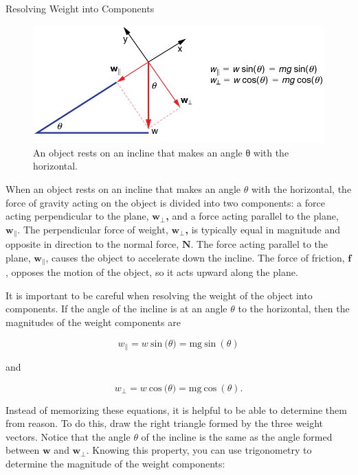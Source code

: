 \documentclass[
]{book}
\newenvironment{note}{}{}
\begin{document}
\hypertarget{fs-id2658609}{}
\begin{note}

Resolving Weight into Components

{\hfill\break
}

\begin{figure}
\hypertarget{import-auto-id1795220}{%
\centering
\includegraphics{images/Figure_04_05_03.jpg}
\caption{An object rests on an incline that makes an angle θ with the
horizontal.}\label{import-auto-id1795220}
}
\end{figure}

When an object rests on an incline that makes an angle \(\theta{}\) with
the horizontal, the force of gravity acting on the object is divided
into two components: a force acting perpendicular to the plane,
\(\textbf{w}_{\bot}{}\)\textbf{,} and a force
acting parallel to the plane, \(\textbf{w}_{\parallel}{}\). The
perpendicular force of weight,
\(\textbf{w}_{\bot}{}\)\textbf{,} is typically
equal in magnitude and opposite in direction to the normal force,
\(\textbf{N}{}\). The force acting parallel to the plane,
\(\textbf{w}_{\parallel}{}\), causes the object to accelerate down the
incline. The force of friction, \(\mathbf{f}{}\), opposes the motion of
the object, so it acts upward along the plane.

It is important to be careful when resolving the weight of the object
into components. If the angle of the incline is at an angle \(\theta{}\)
to the horizontal, then the magnitudes of the weight components are

\leavevmode\hypertarget{eip-id2265769}{}%
\[{{w_{\parallel} = w\ }\text{sin}\ (\theta{) = {\text{mg}\ }}\text{sin}\ (\theta)}{}\]

and

\leavevmode\hypertarget{eip-id1553388}{}%
\[{{w_{\bot} = w\ }\text{cos}\ (\theta{) = \text{mg}\ }\text{cos}\ (\theta)}.\]

Instead of memorizing these equations, it is helpful to be able to
determine them from reason. To do this, draw the right triangle formed
by the three weight vectors. Notice that the angle \(\theta{}\) of the
incline is the same as the angle formed between
\(\textbf{w}{}\)\textbf{} and
\(\textbf{w}_{\bot}{}\)\textbf{}. Knowing this
property, you can use trigonometry to determine the magnitude of the
weight components:


\end{note}
\end{document}
